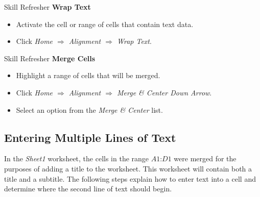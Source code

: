 \begin{center}
	\begin{sklbox}{Skill Refresher}
		\textbf{Wrap Text}
		\\
		\begin{itemize}
			\setlength{\itemsep}{0pt}
			\setlength{\parskip}{0pt}
			\setlength{\parsep}{0pt}
			
			\item Activate the cell or range of cells that contain text data.
			\item Click \textit{Home $ \Rightarrow $ Alignment $ \Rightarrow $ Wrap Text}.

		\end{itemize}
	\end{sklbox}
\end{center}

\begin{center}
	\begin{sklbox}{Skill Refresher}
		\textbf{Merge Cells}
		\\
		\begin{itemize}
			\setlength{\itemsep}{0pt}
			\setlength{\parskip}{0pt}
			\setlength{\parsep}{0pt}
			
			\item Highlight a range of cells that will be merged.
			\item Click \textit{Home $ \Rightarrow $ Alignment $ \Rightarrow $ Merge \& Center Down Arrow}.
			\item Select an option from the \textit{Merge \& Center} list.
			
		\end{itemize}
	\end{sklbox}
\end{center}

\subsection{Entering Multiple Lines of Text}

In the \textit{Sheet1} worksheet, the cells in the range $ A1 $:$ D1 $ were merged for the purposes of adding a title to the worksheet. This worksheet will contain both a title and a subtitle. The following steps explain how to enter text into a cell and determine where the second line of text should begin.

